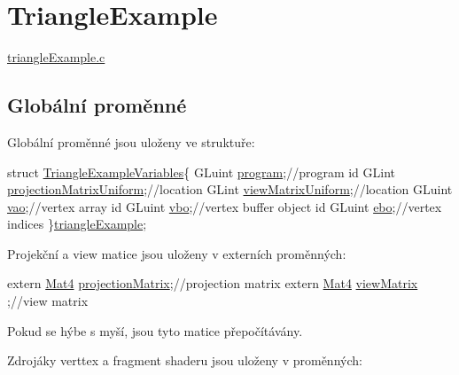 \hypertarget{TriangleExample-example}{\section{Triangle\-Example}
}
\hyperlink{triangleExample_8c}{triangle\-Example.\-c}  \hypertarget{triangleExample.c_Globals}{}\subsection{Globální proměnné}\label{triangleExample.c_Globals}
Globální proměnné jsou uloženy ve struktuře\-: 
\begin{DoxyCodeInclude}

\textcolor{keyword}{struct }\hyperlink{structTriangleExampleVariables}{TriangleExampleVariables}\{
  GLuint \hyperlink{structTriangleExampleVariables_abc287e489a25d4e3c4ad1899d183881d}{program};\textcolor{comment}{//program id}
\textcolor{comment}{}  GLint  \hyperlink{structTriangleExampleVariables_a0215b92b36815394d6a4c8b5e3baa27a}{projectionMatrixUniform};\textcolor{comment}{//location}
\textcolor{comment}{}  GLint  \hyperlink{structTriangleExampleVariables_a94cf55d21d35fb4d0f85c1d7a49e6474}{viewMatrixUniform};\textcolor{comment}{//location}
\textcolor{comment}{}  GLuint \hyperlink{structTriangleExampleVariables_a4230de13079947c4093b8d75ad1d5035}{vao};\textcolor{comment}{//vertex array id}
\textcolor{comment}{}  GLuint \hyperlink{structTriangleExampleVariables_af3b747228ed4a26fffca56a69838ecae}{vbo};\textcolor{comment}{//vertex buffer object id}
\textcolor{comment}{}  GLuint \hyperlink{structTriangleExampleVariables_a9e7c6acc784faacf21bca7c46f9f4244}{ebo};\textcolor{comment}{//vertex indices}
\}\hyperlink{triangleExample_8c_af82b723635ac0c90962571915a1b1163}{triangleExample};
\end{DoxyCodeInclude}
Projekční a view matice jsou uloženy v externích proměnných\-: 
\begin{DoxyCodeInclude}
\textcolor{keyword}{extern} \hyperlink{structMat4}{Mat4} \hyperlink{mouseCamera_8c_a1f344d924f733a22d7659db612a0efe8}{projectionMatrix};\textcolor{comment}{//projection matrix}
\textcolor{comment}{}\textcolor{keyword}{extern} \hyperlink{structMat4}{Mat4} \hyperlink{mouseCamera_8c_ae64ebe4c77936fc93d161b97bd8e96df}{viewMatrix}      ;\textcolor{comment}{//view matrix}
\end{DoxyCodeInclude}
Pokud se hýbe s myší, jsou tyto matice přepočítávány.\par
 Zdrojáky verttex a fragment shaderu jsou uloženy v proměnných\-: 
